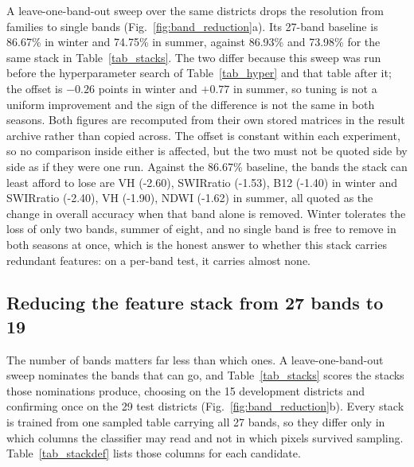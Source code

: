 \documentclass[conference]{IEEEtran}
\begin{document}
A leave-one-band-out sweep over the same districts drops the resolution from families to single bands (Fig.~\ref{fig:band_reduction}a). Its 27-band baseline is 86.67\% in winter and 74.75\% in summer, against 86.93\% and 73.98\% for the same stack in Table~\ref{tab_stacks}. The two differ because this sweep was run before the hyperparameter search of Table~\ref{tab_hyper} and that table after it; the offset is $-0.26$ points in winter and $+0.77$ in summer, so tuning is not a uniform improvement and the sign of the difference is not the same in both seasons. Both figures are recomputed from their own stored matrices in the result archive rather than copied across. The offset is constant within each experiment, so no comparison inside either is affected, but the two must not be quoted side by side as if they were one run. Against the 86.67\% baseline, the bands the stack can least afford to lose are VH (-2.60), SWIRratio (-1.53), B12 (-1.40) in winter and SWIRratio (-2.40), VH (-1.90), NDWI (-1.62) in summer, all quoted as the change in overall accuracy when that band alone is removed. Winter tolerates the loss of only two bands, summer of eight, and no single band is free to remove in both seasons at once, which is the honest answer to whether this stack carries redundant features: on a per-band test, it carries almost none.

\subsection{Reducing the feature stack from 27 bands to 19}
\label{sec:stacks}
The number of bands matters far less than which ones. A leave-one-band-out sweep nominates the bands that can go, and Table~\ref{tab_stacks} scores the stacks those nominations produce, choosing on the 15 development districts and confirming once on the 29 test districts (Fig.~\ref{fig:band_reduction}b). Every stack is trained from one sampled table carrying all 27 bands, so they differ only in which columns the classifier may read and not in which pixels survived sampling. Table~\ref{tab_stackdef} lists those columns for each candidate.
\end{document}
